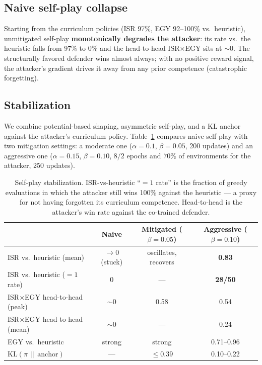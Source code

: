 \documentclass{article}
\begin{document}
\subsection{Naive self-play collapse}
\label{sec:collapse}
Starting from the curriculum policies (ISR 97\%, EGY 92--100\% vs.\ heuristic), unmitigated
self-play \textbf{monotonically degrades the attacker}: its rate vs.\ the heuristic falls
from 97\% to 0\% and the head-to-head ISR$\times$EGY sits at $\sim$0. The structurally
favored defender wins almost always; with no positive reward signal, the attacker's
gradient drives it away from any prior competence (catastrophic forgetting).

\subsection{Stabilization}
We combine potential-based shaping, asymmetric self-play, and a KL anchor against the
attacker's curriculum policy. Table~\ref{tab:stab} compares naive self-play with two
mitigation settings: a moderate one ($\alpha{=}0.1$, $\beta{=}0.05$, 200 updates) and an
aggressive one ($\alpha{=}0.15$, $\beta{=}0.10$, $8$/$2$ epochs and $70\%$ of
environments for the attacker, 250 updates).

\begin{table}[t]
\centering
\caption{Self-play stabilization. ISR-vs-heuristic ``$=1$ rate'' is the fraction of
greedy evaluations in which the attacker still wins 100\% against the heuristic --- a
proxy for not having forgotten its curriculum competence. Head-to-head is the
attacker's win rate against the co-trained defender.}
\label{tab:stab}
\begin{tabular}{lccc}
\toprule
& \textbf{Naive} & \textbf{Mitigated ($\beta{=}0.05$)} & \textbf{Aggressive ($\beta{=}0.10$)} \\
\midrule
ISR vs.\ heuristic (mean) & $\to 0$ (stuck) & oscillates, recovers & \textbf{0.83} \\
ISR vs.\ heuristic ($=1$ rate) & 0 & --- & \textbf{28/50} \\
ISR$\times$EGY head-to-head (peak) & $\sim 0$ & 0.58 & 0.54 \\
ISR$\times$EGY head-to-head (mean) & $\sim 0$ & --- & 0.24 \\
EGY vs.\ heuristic & strong & strong & 0.71--0.96 \\
$\mathrm{KL}(\pi\,\|\,\text{anchor})$ & --- & $\le 0.39$ & 0.10--0.22 \\
\bottomrule
\end{tabular}
\end{table}
\end{document}
